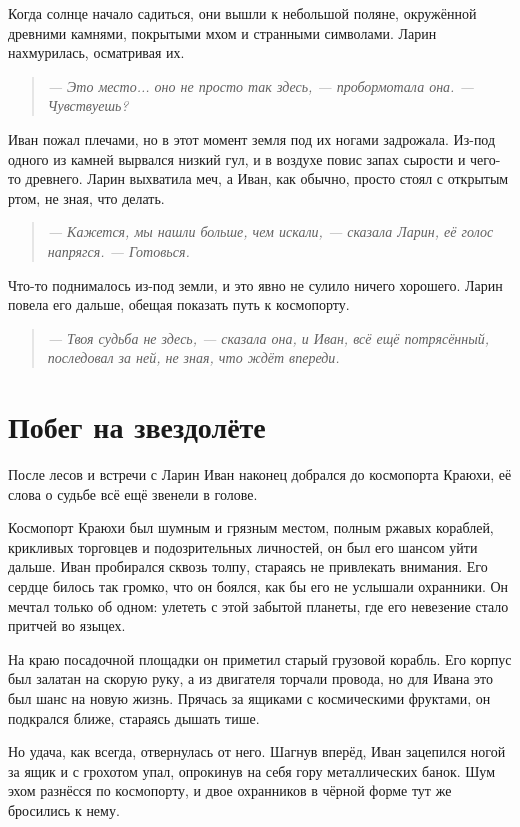 \documentclass[12pt,a4paper]{book}
\newenvironment{dialogue}{\begin{quote}\itshape}{\end{quote}}
\begin{document}
Когда солнце начало садиться, они вышли к небольшой поляне, окружённой древними камнями, покрытыми мхом и странными символами. Ларин нахмурилась, осматривая их.

\begin{dialogue}
--- Это место... оно не просто так здесь, --- пробормотала она. --- Чувствуешь?
\end{dialogue}

Иван пожал плечами, но в этот момент земля под их ногами задрожала. Из-под одного из камней вырвался низкий гул, и в воздухе повис запах сырости и чего-то древнего. Ларин выхватила меч, а Иван, как обычно, просто стоял с открытым ртом, не зная, что делать.

\begin{dialogue}
--- Кажется, мы нашли больше, чем искали, --- сказала Ларин, её голос напрягся. --- Готовься.
\end{dialogue}

Что-то поднималось из-под земли, и это явно не сулило ничего хорошего. Ларин повела его дальше, обещая показать путь к космопорту.

\begin{dialogue}
--- Твоя судьба не здесь, --- сказала она, и Иван, всё ещё потрясённый, последовал за ней, не зная, что ждёт впереди.
\end{dialogue}

\chapter{Побег на звездолёте}

После лесов и встречи с Ларин Иван наконец добрался до космопорта Краюхи, её слова о судьбе всё ещё звенели в голове.

Космопорт Краюхи был шумным и грязным местом, полным ржавых кораблей, крикливых торговцев и подозрительных личностей, он был его шансом уйти дальше. Иван пробирался сквозь толпу, стараясь не привлекать внимания. Его сердце билось так громко, что он боялся, как бы его не услышали охранники. Он мечтал только об одном: улететь с этой забытой планеты, где его невезение стало притчей во языцех.

На краю посадочной площадки он приметил старый грузовой корабль. Его корпус был залатан на скорую руку, а из двигателя торчали провода, но для Ивана это был шанс на новую жизнь. Прячась за ящиками с космическими фруктами, он подкрался ближе, стараясь дышать тише.

Но удача, как всегда, отвернулась от него. Шагнув вперёд, Иван зацепился ногой за ящик и с грохотом упал, опрокинув на себя гору металлических банок. Шум эхом разнёсся по космопорту, и двое охранников в чёрной форме тут же бросились к нему.
\end{document}
